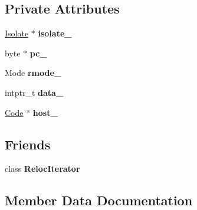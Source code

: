\subsection*{Private Attributes}
\begin{DoxyCompactItemize}
\item 
\hyperlink{classv8_1_1internal_1_1_isolate}{Isolate} $\ast$ {\bfseries isolate\+\_\+}\hypertarget{classv8_1_1internal_1_1_reloc_info_a0e74c3abed616db61962d6a76a6e9c7f}{}\label{classv8_1_1internal_1_1_reloc_info_a0e74c3abed616db61962d6a76a6e9c7f}

\item 
byte $\ast$ {\bfseries pc\+\_\+}\hypertarget{classv8_1_1internal_1_1_reloc_info_a54199fd38eff018854d97c8b676af692}{}\label{classv8_1_1internal_1_1_reloc_info_a54199fd38eff018854d97c8b676af692}

\item 
Mode {\bfseries rmode\+\_\+}\hypertarget{classv8_1_1internal_1_1_reloc_info_ae6944586e8f9650af37d1bb494cd4a39}{}\label{classv8_1_1internal_1_1_reloc_info_ae6944586e8f9650af37d1bb494cd4a39}

\item 
intptr\+\_\+t {\bfseries data\+\_\+}\hypertarget{classv8_1_1internal_1_1_reloc_info_a4a40e64d49d580326d39860e0f8fe009}{}\label{classv8_1_1internal_1_1_reloc_info_a4a40e64d49d580326d39860e0f8fe009}

\item 
\hyperlink{classv8_1_1internal_1_1_code}{Code} $\ast$ {\bfseries host\+\_\+}\hypertarget{classv8_1_1internal_1_1_reloc_info_a390fda5937286e407c4ecb530ad4f62d}{}\label{classv8_1_1internal_1_1_reloc_info_a390fda5937286e407c4ecb530ad4f62d}

\end{DoxyCompactItemize}
\subsection*{Friends}
\begin{DoxyCompactItemize}
\item 
class {\bfseries Reloc\+Iterator}\hypertarget{classv8_1_1internal_1_1_reloc_info_a9ff673d9f08f4ce3738760e4e66dc88a}{}\label{classv8_1_1internal_1_1_reloc_info_a9ff673d9f08f4ce3738760e4e66dc88a}

\end{DoxyCompactItemize}


\subsection{Member Data Documentation}
